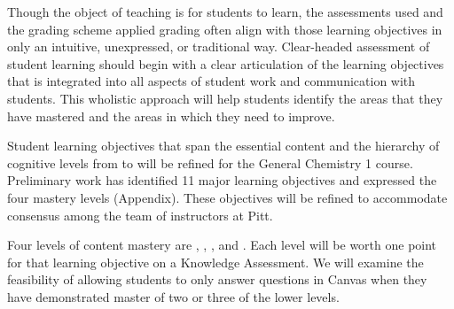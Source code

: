 \documentclass[10pt,letterpaper]{article}
\begin{document}
%
%
Though the object of teaching is for students to learn,  the assessments used and the grading scheme applied grading often align with those learning objectives in only an intuitive, unexpressed, or traditional way. Clear-headed assessment of student learning should begin with a clear articulation of the learning objectives that is integrated into all aspects of student work and communication with students. This wholistic approach will help students identify the areas that they have mastered and the areas in which  they need to improve.

Student learning objectives that span the essential content and the hierarchy of cognitive levels from \recall to \use will be refined for the General Chemistry 1 course. Preliminary work has identified 11 major learning objectives and expressed the four mastery levels (Appendix). These objectives will be refined to accommodate consensus among the team of \pogil instructors at Pitt. 


 Four levels of content mastery are \recall, \comprehension, \analysis, and \use. Each level will be worth one point for that learning objective on a Knowledge Assessment. We will examine the feasibility of allowing students to only answer \use questions in Canvas when they have demonstrated master of two or three of the lower levels. 
\end{document}
